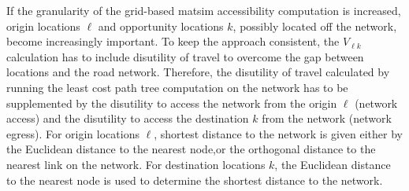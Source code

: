 If the granularity of the grid-based \gls{matsim} accessibility computation is increased, origin
locations $\ell$ and opportunity locations $k$, possibly located off the network, become increasingly 
important. To keep the approach consistent, the $V_{\ell k}$ calculation has to include disutility
of travel to overcome the gap between locations and the road network. Therefore, the disutility of travel
calculated by running the least cost path tree computation on the network has to be supplemented by the
disutility to access the network from the origin $\ell$ (network access) and the disutility to access the
destination $k$ from the network (network egress). For origin locations $\ell$, shortest distance to the
network is given either by the Euclidean distance to the nearest node,or the orthogonal distance to the
nearest link on the network.
For destination locations $k$, the Euclidean distance to the nearest node is used to determine
the shortest distance to the network.
%
%
%
%
